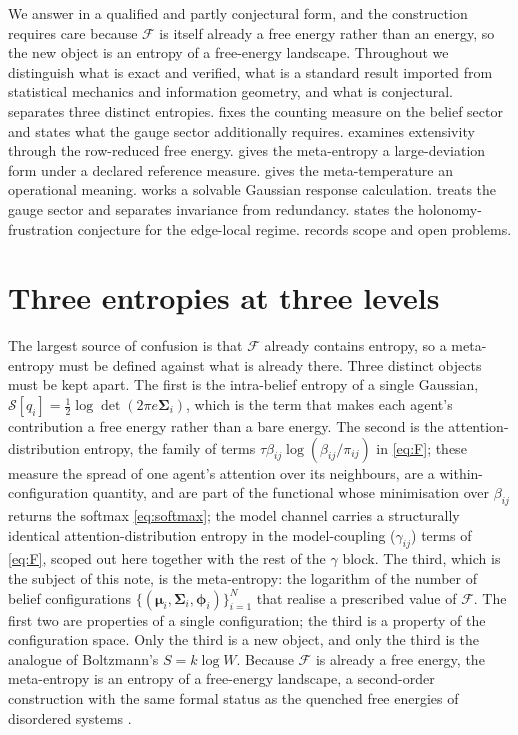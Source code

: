 \documentclass[11pt]{article}
\theoremstyle{plain}
\theoremstyle{definition}
\newcommand{\bmu}{\boldsymbol{\mu}}
\newcommand{\bSigma}{\boldsymbol{\Sigma}}
\newcommand{\bphi}{\boldsymbol{\phi}}
\newcommand{\Fcal}{\mathcal{F}}
\newcommand{\Scal}{\mathcal{S}}
\newcommand{\betaij}{\beta_{ij}}
\begin{document}
We answer in a qualified and partly conjectural form, and the construction requires care
because $\Fcal$ is itself already a free energy rather than an energy, so the new object
is an entropy of a free-energy landscape. Throughout we distinguish what is exact and
verified, what is a standard result imported from statistical mechanics and information
geometry, and what is conjectural.  separates three distinct entropies.
 fixes the counting measure on the belief sector and states what the
gauge sector additionally requires.  examines extensivity through the
row-reduced free energy.  gives the meta-entropy a large-deviation form
under a declared reference measure.  gives the meta-temperature an
operational meaning.  works a solvable Gaussian response calculation.
 treats the gauge sector and separates invariance from redundancy.
 states the holonomy-frustration conjecture for the edge-local
regime.  records scope and open problems.

\section{Three entropies at three levels}
\label{sec:three}

The largest source of confusion is that $\Fcal$ already contains entropy, so a
meta-entropy must be defined against what is already there. Three distinct objects must
be kept apart. The first is the intra-belief entropy of a single Gaussian,
$\Scal[q_i] = \tfrac12\log\det(2\pi e\bSigma_i)$, which is the term that makes each
agent's contribution a free energy rather than a bare energy. The second is the
attention-distribution entropy, the family of terms
$\tau\betaij\log(\betaij/\pi_{ij})$ in \cref{eq:F}; these measure the spread of one
agent's attention over its neighbours, are a within-configuration quantity, and are part
of the functional whose minimisation over $\betaij$ returns the softmax \cref{eq:softmax}; the model channel carries a structurally identical attention-distribution entropy in the model-coupling ($\gamma_{ij}$) terms of \cref{eq:F}, scoped out here together with the rest of the $\gamma$ block.
The third, which is the subject of this note, is the meta-entropy: the logarithm of the
number of belief configurations $\{(\bmu_i,\bSigma_i,\bphi_i)\}_{i=1}^{N}$ that realise a
prescribed value of $\Fcal$. The first two are properties of a single configuration; the
third is a property of the configuration space. Only the third is a new object, and only
the third is the analogue of Boltzmann's $S=k\log W$. Because $\Fcal$ is already a free
energy, the meta-entropy is an entropy of a free-energy landscape, a second-order
construction with the same formal status as the quenched free energies of disordered
systems \citep{mezard1987spin}.
\end{document}
